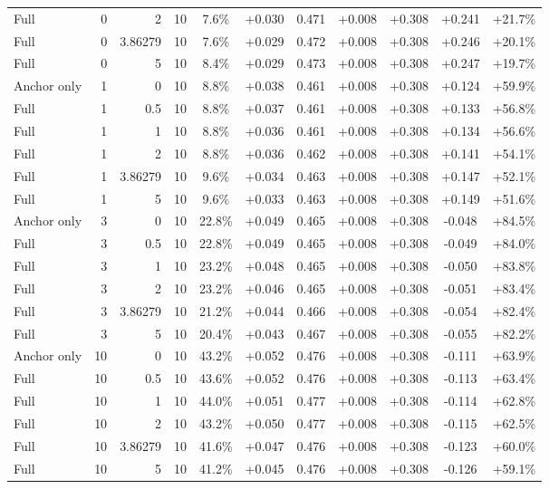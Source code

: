 \begin{table}[htbp]
\begin{tabular}{lrrrccccccc}
Full & 0 & 2 & 10 & 7.6\% & +0.030 & 0.471 & +0.008 & +0.308 & +0.241 & +21.7\% \\
Full & 0 & 3.86279 & 10 & 7.6\% & +0.029 & 0.472 & +0.008 & +0.308 & +0.246 & +20.1\% \\
Full & 0 & 5 & 10 & 8.4\% & +0.029 & 0.473 & +0.008 & +0.308 & +0.247 & +19.7\% \\
Anchor only & 1 & 0 & 10 & 8.8\% & +0.038 & 0.461 & +0.008 & +0.308 & +0.124 & +59.9\% \\
Full & 1 & 0.5 & 10 & 8.8\% & +0.037 & 0.461 & +0.008 & +0.308 & +0.133 & +56.8\% \\
Full & 1 & 1 & 10 & 8.8\% & +0.036 & 0.461 & +0.008 & +0.308 & +0.134 & +56.6\% \\
Full & 1 & 2 & 10 & 8.8\% & +0.036 & 0.462 & +0.008 & +0.308 & +0.141 & +54.1\% \\
Full & 1 & 3.86279 & 10 & 9.6\% & +0.034 & 0.463 & +0.008 & +0.308 & +0.147 & +52.1\% \\
Full & 1 & 5 & 10 & 9.6\% & +0.033 & 0.463 & +0.008 & +0.308 & +0.149 & +51.6\% \\
Anchor only & 3 & 0 & 10 & 22.8\% & +0.049 & 0.465 & +0.008 & +0.308 & -0.048 & +84.5\% \\
Full & 3 & 0.5 & 10 & 22.8\% & +0.049 & 0.465 & +0.008 & +0.308 & -0.049 & +84.0\% \\
Full & 3 & 1 & 10 & 23.2\% & +0.048 & 0.465 & +0.008 & +0.308 & -0.050 & +83.8\% \\
Full & 3 & 2 & 10 & 23.2\% & +0.046 & 0.465 & +0.008 & +0.308 & -0.051 & +83.4\% \\
Full & 3 & 3.86279 & 10 & 21.2\% & +0.044 & 0.466 & +0.008 & +0.308 & -0.054 & +82.4\% \\
Full & 3 & 5 & 10 & 20.4\% & +0.043 & 0.467 & +0.008 & +0.308 & -0.055 & +82.2\% \\
Anchor only & 10 & 0 & 10 & 43.2\% & +0.052 & 0.476 & +0.008 & +0.308 & -0.111 & +63.9\% \\
Full & 10 & 0.5 & 10 & 43.6\% & +0.052 & 0.476 & +0.008 & +0.308 & -0.113 & +63.4\% \\
Full & 10 & 1 & 10 & 44.0\% & +0.051 & 0.477 & +0.008 & +0.308 & -0.114 & +62.8\% \\
Full & 10 & 2 & 10 & 43.2\% & +0.050 & 0.477 & +0.008 & +0.308 & -0.115 & +62.5\% \\
Full & 10 & 3.86279 & 10 & 41.6\% & +0.047 & 0.476 & +0.008 & +0.308 & -0.123 & +60.0\% \\
Full & 10 & 5 & 10 & 41.2\% & +0.045 & 0.476 & +0.008 & +0.308 & -0.126 & +59.1\% \\

\end{tabular}
\end{table}
